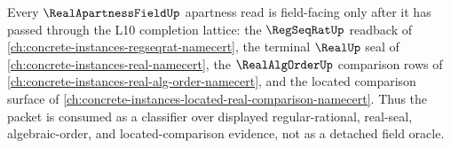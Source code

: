 Every $\RealApartnessFieldUp$ apartness read is field-facing only after it has passed through the L10 completion lattice: the $\RegSeqRatUp$ readback of \autoref{ch:concrete-instances-regseqrat-namecert}, the terminal $\RealUp$ seal of \autoref{ch:concrete-instances-real-namecert}, the $\RealAlgOrderUp$ comparison rows of \autoref{ch:concrete-instances-real-alg-order-namecert}, and the located comparison surface of \autoref{ch:concrete-instances-located-real-comparison-namecert}. Thus the packet is consumed as a classifier over displayed regular-rational, real-seal, algebraic-order, and located-comparison evidence, not as a detached field oracle.

